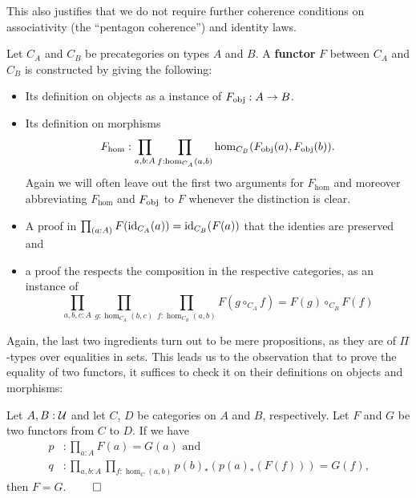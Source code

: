 This also justifies that we do not require further coherence conditions on
associativity (the ``pentagon coherence'') and identity laws. %

\begin{defn} [Functors] \label{def:hott-precat-functor}
Let $C_A$ and $C_B$ be precategories on types $A$ and $B$.
A \textbf{functor} $F$ between $C_A$ and $C_B$ is constructed by giving the following:
\begin{itemize}
\item Its definition on objects as a instance of $F_{\operatorname{obj}}: A \to B$.
\item Its definition on morphisms
\begin{equation*}
F_{\hom} : \prod_{a,b:A} \prod_{f:\hom_{C_A}(a,b)} \hom_{C_B}(F_{\operatorname{obj}}(a),F_{\operatorname{obj}}(b))\text{.}
\end{equation*}
Again we will often leave out the first two arguments for $F_{\hom}$ and moreover
abbreviating $F_{\hom}$ and $F_{\operatorname{obj}}$ to $F$ whenever the distinction is clear.
\item A proof in $\prod_{(a:A)} F(\operatorname{id}_{C_A}(a)) = \operatorname{id}_{C_B}(F(a))$ that the identies
are preserved and
\item a proof the respects the composition in the respective categories, as an instance
of
\begin{equation*}
\prod_{a,b,c:A} \prod_{g:\hom_{C_A}(b,c)} \prod_{f:\hom_{C_B}(a,b)}
F(g \circ_{C_A} f) = F(g) \circ_{C_B} F(f)
\end{equation*}
\end{itemize}
\end{defn}

Again, the last two ingredients turn out to be mere propositions, as they are
of $\Pi$-types over equalities in sets.
This leads us to the observation that to prove the equality of two functors, it
suffices to check it on their definitions on objects and morphisms:

\begin{lemma}
Let $A, B : \mathcal{U}$ and let $C$, $D$ be categories on $A$ and $B$, respectively.
Let $F$ and $G$ be two functors from $C$ to $D$. If we have
\begin{align*}
p &: \prod_{a:A} F(a) = G(a) \text{ and } \\
q &: \prod_{a,b:A} \prod_{f : \hom_C(a,b)} p(b)_*\left(p(a)_*(F(f))\right) = G(f) \text{,}
\end{align*}
then $F = G$. \hfill $\qed$
\end{lemma}

